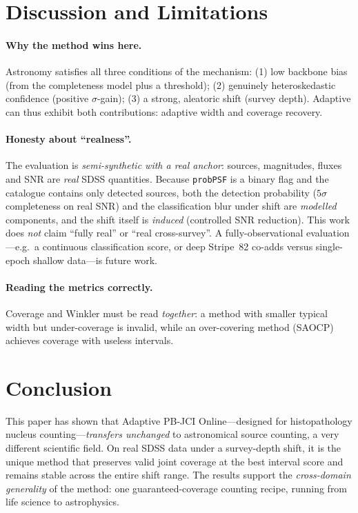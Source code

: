 \documentclass[pdflatex,sn-mathphys-num]{sn-jnl}%
\begin{document}
\section{Discussion and Limitations}\label{sec:discussion}

\paragraph{Why the method wins here.} Astronomy satisfies all three conditions of the mechanism: (1) low
backbone bias (from the completeness model plus a threshold); (2) genuinely heteroskedastic confidence
(positive $\sigma$-gain); (3) a strong, aleatoric shift (survey depth). Adaptive can thus exhibit both
contributions: adaptive width and coverage recovery.

\paragraph{Honesty about ``realness''.} The evaluation is \emph{semi-synthetic with a real anchor}: sources,
magnitudes, fluxes and SNR are \emph{real} SDSS quantities. Because \texttt{probPSF} is a binary flag and the
catalogue contains only detected sources, both the detection probability ($5\sigma$ completeness on real SNR)
and the classification blur under shift are \emph{modelled} components, and the shift itself is
\emph{induced} (controlled SNR reduction). This work does \emph{not} claim ``fully real'' or ``real
cross-survey''. A fully-observational evaluation---e.g.\ a continuous classification score, or deep
Stripe~82 co-adds versus single-epoch shallow data---is future work.

\paragraph{Reading the metrics correctly.} Coverage and Winkler must be read \emph{together}: a method with
smaller typical width but under-coverage is invalid, while an over-covering method (SAOCP) achieves coverage
with useless intervals.

\section{Conclusion}\label{sec:conclusion}

This paper has shown that Adaptive PB-JCI Online---designed for histopathology nucleus
counting---\emph{transfers unchanged} to astronomical source counting, a very different scientific field. On real SDSS data under a
survey-depth shift, it is the unique method that preserves valid joint coverage at the best interval score
and remains stable across the entire shift range. The results support the \emph{cross-domain generality} of
the method: one guaranteed-coverage counting recipe, running from life science to astrophysics.
\end{document}
